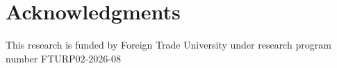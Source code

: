 \section*{Acknowledgments}
This research is funded by Foreign Trade University under research program number FTURP02-2026-08


